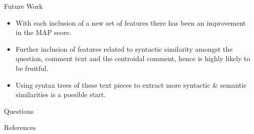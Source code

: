 \documentclass[10pt]{beamer}
\begin{document}
\begin{frame}{Future Work}
\begin{itemize}
\item With each inclusion of a new set of features there has been an improvement in the MAP score.
\item Further inclusion of features related to syntactic similarity amongst the question, comment text and the centroidal comment, hence is highly likely to be fruitful.
\item Using syntax trees of these text pieces to extract more syntactic \& semantic similarities is a possible start.
\end{itemize}
\end{frame}

\begin{frame}[standout]
  Questions
\end{frame}

\begin{frame}[allowframebreaks]{References}

  
  

\end{frame}
\end{document}
